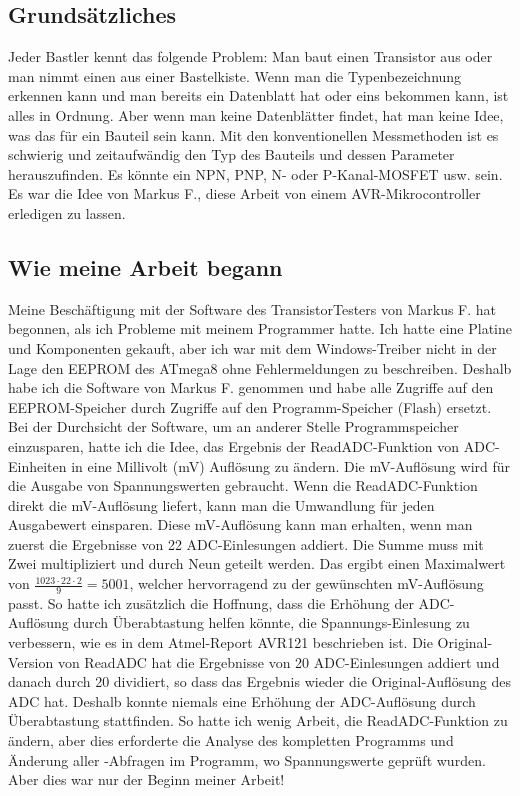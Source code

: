 \subsection*{Grundsätzliches}
Jeder Bastler kennt das folgende Problem: Man baut einen Transistor aus oder man nimmt einen aus einer Bastelkiste.
Wenn man die Typenbezeichnung erkennen kann und man bereits ein Datenblatt hat oder eins bekommen kann, ist alles in Ordnung.
Aber wenn man keine Datenblätter findet, hat man keine Idee, was das für ein Bauteil sein kann.
Mit den konventionellen Messmethoden ist es schwierig und zeitaufwändig den Typ des Bauteils und dessen Parameter herauszufinden.
Es könnte ein NPN, PNP, N- oder P-Kanal-MOSFET usw. sein. 
Es war die Idee von Markus F., diese Arbeit von einem AVR-Mikrocontroller erledigen zu lassen.

\subsection*{Wie meine Arbeit begann}
Meine Beschäftigung mit der Software des TransistorTesters von Markus F. \cite{Frejek} hat begonnen, als ich Probleme mit
meinem Programmer hatte.
Ich hatte eine Platine und Komponenten gekauft, aber ich war mit dem Windows-Treiber nicht in der Lage den EEPROM des ATmega8
ohne Fehlermeldungen zu beschreiben.
Deshalb habe ich die Software von Markus F. genommen und habe alle Zugriffe auf den EEPROM-Speicher durch
Zugriffe auf den Programm-Speicher (Flash) ersetzt.
Bei der Durchsicht der Software, um an anderer Stelle Programmspeicher einzusparen, hatte ich die Idee,
das Ergebnis der ReadADC-Funktion von ADC-Einheiten in eine Millivolt (mV) Auflösung zu ändern.
Die mV-Auflösung wird für die Ausgabe von Spannungswerten gebraucht.
Wenn die ReadADC-Funktion direkt die mV-Auflösung liefert, kann man die Umwandlung für jeden Ausgabewert einsparen.
Diese mV-Auflösung kann man erhalten, wenn man zuerst die Ergebnisse von 22 ADC-Einlesungen addiert.
Die Summe muss mit Zwei multipliziert und durch Neun geteilt werden.
Das ergibt einen Maximalwert von \begin{math}\frac{1023\cdot22\cdot2}{9} = 5001\end{math},
welcher hervorragend zu der gewünschten mV-Auflösung passt.
So hatte ich zusätzlich die Hoffnung, dass die Erhöhung der ADC-Auflösung durch Überabtastung helfen
könnte, die Spannungs-Einlesung zu verbessern, wie es in dem Atmel-Report AVR121 \cite{AVR121} beschrieben ist.
Die Original-Version von ReadADC hat die Ergebnisse von 20 ADC-Einlesungen addiert und danach durch 20 dividiert,
so dass das Ergebnis wieder die Original-Auflösung des ADC hat. Deshalb konnte niemals eine Erhöhung der ADC-Auflösung
durch Überabtastung stattfinden.
So hatte ich wenig Arbeit, die ReadADC-Funktion zu ändern, aber dies erforderte die Analyse des kompletten
Programms und Änderung aller -Abfragen im Programm, wo Spannungswerte geprüft wurden.
Aber dies war nur der Beginn meiner Arbeit!

